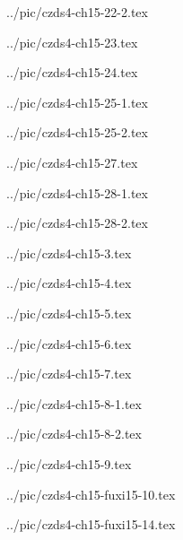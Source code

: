 

../pic/czds4-ch15-22-2.tex



../pic/czds4-ch15-23.tex



../pic/czds4-ch15-24.tex



../pic/czds4-ch15-25-1.tex



../pic/czds4-ch15-25-2.tex



../pic/czds4-ch15-27.tex



../pic/czds4-ch15-28-1.tex



../pic/czds4-ch15-28-2.tex



../pic/czds4-ch15-3.tex



../pic/czds4-ch15-4.tex



../pic/czds4-ch15-5.tex



../pic/czds4-ch15-6.tex



../pic/czds4-ch15-7.tex



../pic/czds4-ch15-8-1.tex



../pic/czds4-ch15-8-2.tex



../pic/czds4-ch15-9.tex



../pic/czds4-ch15-fuxi15-10.tex



../pic/czds4-ch15-fuxi15-14.tex



